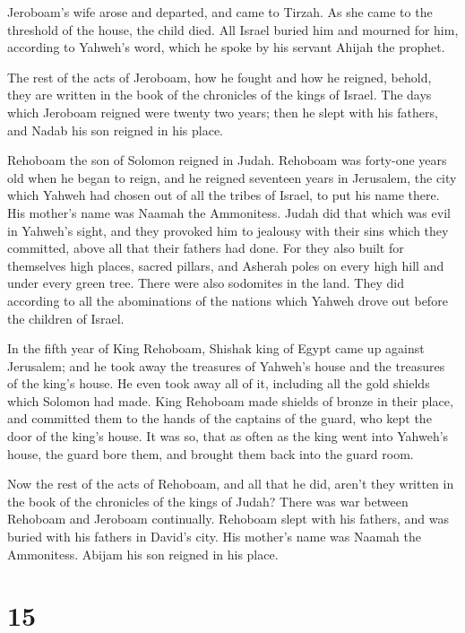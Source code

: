  Jeroboam's wife arose and departed, and came to Tirzah.
As she came to the threshold of the house, the child died.
 All Israel buried him and mourned for him, according to
Yahweh's word, which he spoke by his servant Ahijah the prophet.

 The rest of the acts of Jeroboam, how he fought and how
he reigned, behold, they are written in the book of the chronicles of
the kings of Israel.  The days which Jeroboam reigned
were twenty two years; then he slept with his fathers, and Nadab his son
reigned in his place.

 Rehoboam the son of Solomon reigned in Judah. Rehoboam
was forty-one years old when he began to reign, and he reigned seventeen
years in Jerusalem, the city which Yahweh had chosen out of all the
tribes of Israel, to put his name there. His mother's name was Naamah
the Ammonitess.  Judah did that which was evil in
Yahweh's sight, and they provoked him to jealousy with their sins which
they committed, above all that their fathers had done. 
For they also built for themselves high places, sacred pillars, and
Asherah poles on every high hill and under every green tree.
 There were also sodomites in the land. They did
according to all the abominations of the nations which Yahweh drove out
before the children of Israel.

 In the fifth year of King Rehoboam, Shishak king of
Egypt came up against Jerusalem;  and he took away the
treasures of Yahweh's house and the treasures of the king's house. He
even took away all of it, including all the gold shields which Solomon
had made.  King Rehoboam made shields of bronze in their
place, and committed them to the hands of the captains of the guard, who
kept the door of the king's house.  It was so, that as
often as the king went into Yahweh's house, the guard bore them, and
brought them back into the guard room.

 Now the rest of the acts of Rehoboam, and all that he
did, aren't they written in the book of the chronicles of the kings of
Judah?  There was war between Rehoboam and Jeroboam
continually.  Rehoboam slept with his fathers, and was
buried with his fathers in David's city. His mother's name was Naamah
the Ammonitess. Abijam his son reigned in his place.

\hypertarget{section-14}{%
\section{15}\label{section-14}}

